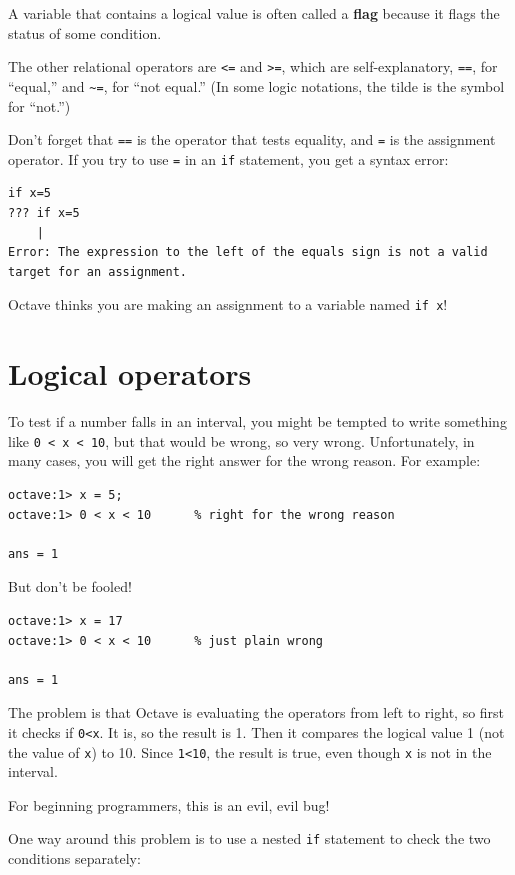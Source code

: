 \documentclass{book}
\begin{document}
A variable that contains a logical value is often called a {\bf flag}
because it flags the status of some condition.

The other relational operators are {\tt <=} and {\tt >=}, which are
self-explanatory, {\tt ==}, for ``equal,'' and 
\verb+~=+, for ``not equal.'' (In some logic notations, the tilde
is the symbol for ``not.'')

Don't forget that {\tt ==} is the operator that tests equality,
and {\tt =} is the assignment operator. If you try to use {\tt =} in
an {\tt if} statement, you get a syntax error:

\begin{verbatim}
if x=5
??? if x=5
    |
Error: The expression to the left of the equals sign is not a valid 
target for an assignment.
\end{verbatim}

Octave thinks you are making an assignment to a variable named {\tt if x}! 


\section{Logical operators}
\label{logop}

To test if a number falls in an interval, you might be
tempted to write something like {\tt 0 < x < 10}, but that
would be wrong, so very wrong. Unfortunately, in many cases,
you will get the right answer for the wrong reason. For
example:

\begin{verbatim}
octave:1> x = 5;
octave:1> 0 < x < 10      % right for the wrong reason

ans = 1
\end{verbatim}

But don't be fooled!

\begin{verbatim}
octave:1> x = 17
octave:1> 0 < x < 10      % just plain wrong

ans = 1
\end{verbatim}

The problem is that Octave is evaluating the operators from left
to right, so first it checks if {\tt 0<x}. It is, so the result
is 1. Then it compares the logical value 1 (not the value of
{\tt x}) to 10. Since {\tt 1<10}, the result is true, even though
{\tt x} is not in the interval.

For beginning programmers, this is an evil, evil bug!

One way around this problem is to use a nested {\tt if} statement to
check the two conditions separately:
\end{document}
